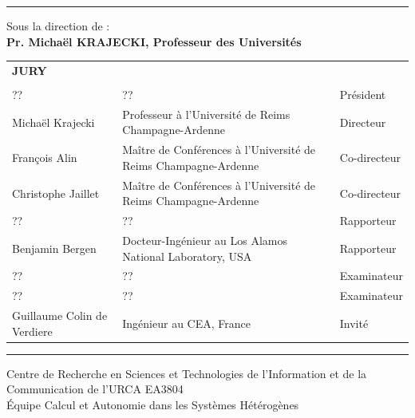\documentclass[11pt,a4paper]{book}
\begin{document}
{\vspace{1.0cm}
\hrule

\vspace{1cm}

{
Sous la direction de :\\ 
\textbf{Pr. Michaël KRAJECKI, Professeur des Universités}
}
\vspace{0.5cm}

\vspace{\fill}

{\normalsize
\begin{tabular}{l l l}
\textbf{JURY} &  & \\
&&\\
?? & ?? & Pr\'esident\\
Michaël Krajecki & Professeur à l'Université de Reims Champagne-Ardenne & Directeur \\
François Alin & Maître de Conférences à l'Université de Reims Champagne-Ardenne & Co-directeur  \\
Christophe Jaillet & Maître de Conférences à l'Université de Reims Champagne-Ardenne & Co-directeur \\
?? & ?? & Rapporteur\\
Benjamin Bergen & Docteur-Ingénieur au Los Alamos National Laboratory, USA & Rapporteur \\
?? & ?? & Examinateur\\
?? & ?? & Examinateur\\
Guillaume Colin de Verdiere & Ingénieur au CEA, France & Invit\'e\\
\end{tabular}

\vspace{0.5cm}

\hrule

\vspace{0.5cm}

Centre de Recherche en Sciences et Technologies de l'Information et de la Communication de l'URCA EA3804\\ 
\'Equipe Calcul et Autonomie dans les Systèmes Hétérogènes

}

}%
\clearpage 
{}
\thispagestyle{empty}

\frontmatter


\end{document}

